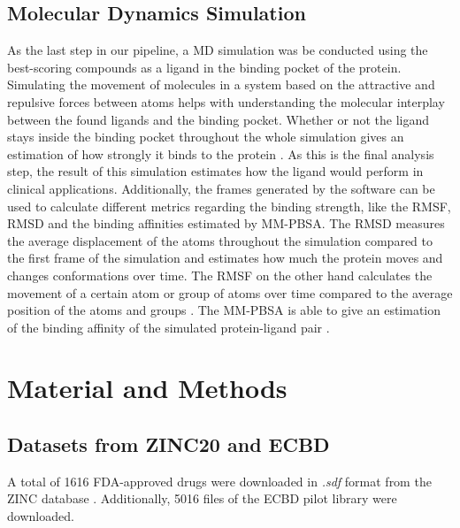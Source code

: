 \documentclass[11pt, letterpaper, titlepage]{article}
\renewcommand{\cite}{\parencite}
\begin{document}
\subsection{Molecular Dynamics Simulation}
As the last step in our pipeline, a \ac{MD} simulation was be conducted using the best-scoring compounds as a ligand in the binding pocket of the protein. Simulating the movement of molecules in a system based on the attractive and repulsive forces between atoms helps with understanding the molecular interplay between the found ligands and the binding pocket. Whether or not the ligand stays inside the binding pocket throughout the whole simulation gives an estimation of how strongly it binds to the protein \cite{MD_Basics}. As this is the final analysis step, the result of this simulation estimates how the ligand would perform in clinical applications. Additionally, the frames generated by the software can be used to calculate different metrics regarding the binding strength, like the \ac{RMSF}, \ac{RMSD} and the binding affinities estimated by \ac{MM-PBSA}. The \ac{RMSD} measures the average displacement of the atoms throughout the simulation compared to the first frame of the simulation and estimates how much the protein moves and changes conformations over time. The \ac{RMSF} on the other hand calculates the movement of a certain atom or group of atoms over time compared to the average position of the atoms and groups \cite{RMSD_RMSF}. The \ac{MM-PBSA} is able to give an estimation of the binding affinity of the simulated protein-ligand pair \cite{MM_PBSA}.

\section{Material and Methods}
\subsection{Datasets from ZINC20 and ECBD}
A total of 1616 \ac{FDA}-approved drugs were downloaded in \textit{.sdf} format from the ZINC database \cite{Irwin.2020}. Additionally, 5016 files of the \ac{ECBD} pilot library \cite{ecbd_website} were downloaded.
\end{document}
